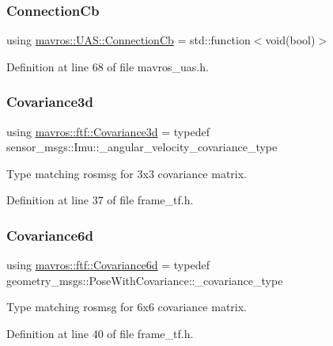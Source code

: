\subsubsection{\texorpdfstring{ConnectionCb}{ConnectionCb}}
{\footnotesize\ttfamily using \mbox{\hyperlink{group__nodelib_gae26d7ffaa66c0d7996857ca12600dab5}{mavros\+::\+U\+A\+S\+::\+Connection\+Cb}} =  std\+::function$<$void(bool)$>$}



Definition at line 68 of file mavros\+\_\+uas.\+h.

\mbox{\label{group__nodelib_ga56776cc8f5410a6bfeafa085fcd6fe30}} 
\subsubsection{\texorpdfstring{Covariance3d}{Covariance3d}}
{\footnotesize\ttfamily using \mbox{\hyperlink{group__nodelib_ga56776cc8f5410a6bfeafa085fcd6fe30}{mavros\+::ftf\+::\+Covariance3d}} = typedef sensor\+\_\+msgs\+::\+Imu\+::\+\_\+angular\+\_\+velocity\+\_\+covariance\+\_\+type}



Type matching rosmsg for 3x3 covariance matrix. 



Definition at line 37 of file frame\+\_\+tf.\+h.

\mbox{\label{group__nodelib_gadc24a922dd3f6a7ff0d7aed9bda42bca}} 
\subsubsection{\texorpdfstring{Covariance6d}{Covariance6d}}
{\footnotesize\ttfamily using \mbox{\hyperlink{group__nodelib_gadc24a922dd3f6a7ff0d7aed9bda42bca}{mavros\+::ftf\+::\+Covariance6d}} = typedef geometry\+\_\+msgs\+::\+Pose\+With\+Covariance\+::\+\_\+covariance\+\_\+type}



Type matching rosmsg for 6x6 covariance matrix. 



Definition at line 40 of file frame\+\_\+tf.\+h.

\mbox{\label{group__nodelib_ga6df3c37d3cd74b3e6919e734575bb9b7}} 
